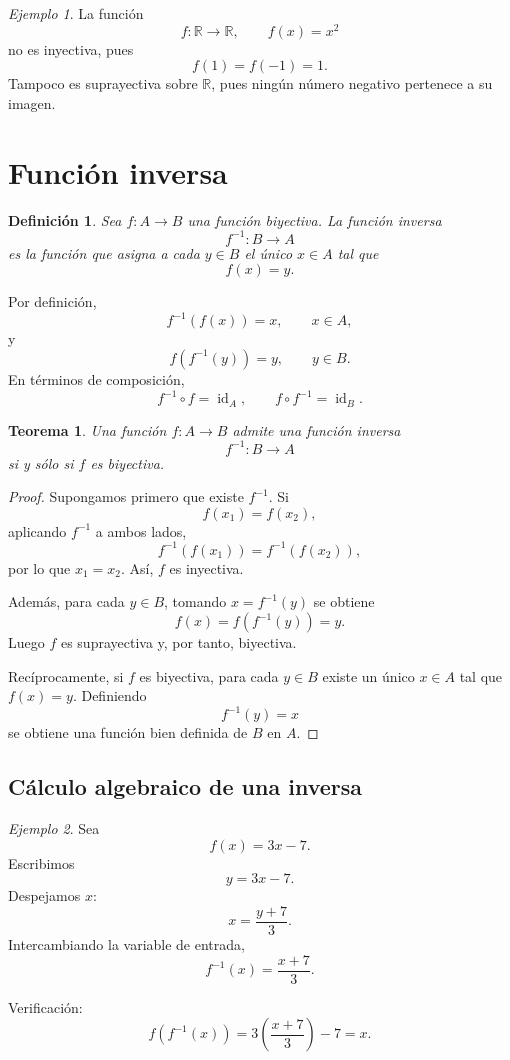 \documentclass[12pt]{article}
\newtheorem{definicion}{Definición}[section]
\newtheorem{teorema}{Teorema}[section]
\theoremstyle{remark}
\newtheorem{ejemplo}{Ejemplo}[section]
\newcommand{\R}{\mathbb{R}}
\newcommand{\id}{\operatorname{id}}
\begin{document}
\begin{ejemplo}
La función
\[
f:\R\to\R,\qquad f(x)=x^2
\]
no es inyectiva, pues
\[
f(1)=f(-1)=1.
\]
Tampoco es suprayectiva sobre $\R$, pues ningún número negativo pertenece a su
imagen.
\end{ejemplo}

\section{Función inversa}

\begin{definicion}
Sea $f:A\to B$ una función biyectiva. La función inversa
\[
f^{-1}:B\to A
\]
es la función que asigna a cada $y\in B$ el único $x\in A$ tal que
\[
f(x)=y.
\]
\end{definicion}

Por definición,
\[
f^{-1}(f(x))=x,\qquad x\in A,
\]
y
\[
f(f^{-1}(y))=y,\qquad y\in B.
\]
En términos de composición,
\[
f^{-1}\circ f=\id_A,
\qquad
f\circ f^{-1}=\id_B.
\]

\begin{teorema}
Una función $f:A\to B$ admite una función inversa
\[
f^{-1}:B\to A
\]
si y sólo si $f$ es biyectiva.
\end{teorema}

\begin{proof}
Supongamos primero que existe $f^{-1}$. Si
\[
f(x_1)=f(x_2),
\]
aplicando $f^{-1}$ a ambos lados,
\[
f^{-1}(f(x_1))=f^{-1}(f(x_2)),
\]
por lo que $x_1=x_2$. Así, $f$ es inyectiva.

Además, para cada $y\in B$, tomando $x=f^{-1}(y)$ se obtiene
\[
f(x)=f(f^{-1}(y))=y.
\]
Luego $f$ es suprayectiva y, por tanto, biyectiva.

Recíprocamente, si $f$ es biyectiva, para cada $y\in B$ existe un único
$x\in A$ tal que $f(x)=y$. Definiendo
\[
f^{-1}(y)=x
\]
se obtiene una función bien definida de $B$ en $A$.
\end{proof}

\subsection*{Cálculo algebraico de una inversa}

\begin{ejemplo}
Sea
\[
f(x)=3x-7.
\]
Escribimos
\[
y=3x-7.
\]
Despejamos $x$:
\[
x=\frac{y+7}{3}.
\]
Intercambiando la variable de entrada,
\[
f^{-1}(x)=\frac{x+7}{3}.
\]

Verificación:
\[
f(f^{-1}(x))
=3\left(\frac{x+7}{3}\right)-7=x.
\]
\end{ejemplo}
\end{document}
